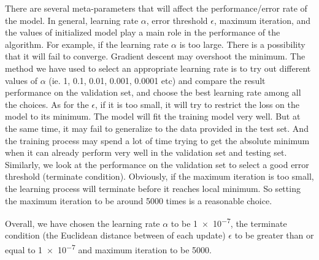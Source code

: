 \documentclass{article}
\begin{document}
\begin{part3}
There are several meta-parameters that will affect the performance/error rate of the model. In general, learning rate $\alpha$, error threshold $\epsilon$, maximum iteration, and the values of initialized model play a main role in the performance of the algorithm. For example, if the learning rate $\alpha$ is too large. There is a possibility that it will fail to converge. Gradient descent may overshoot the minimum. The method we have used to select an appropriate learning rate is to try out different values of $\alpha$ (ie. 1, 0.1, 0.01, 0.001, 0.0001 etc) and compare the result performance on the validation set, and choose the best learning rate among all the choices. As for the $\epsilon$, if it is too small, it will try to restrict the loss on the model to its minimum. The model will fit the training model very well. But at the same time, it may fail to generalize to the data provided in the test set. And the training process may spend a lot of time trying to get the absolute minimum when it can already perform very well in the validation set and testing set. Similarly, we look at the performance on the validation set to select a good error threshold (terminate condition). Obviously, if the maximum iteration is too small, the learning process will terminate before it reaches local minimum. So setting the maximum iteration to be around 5000 times is a reasonable choice.

\vspace{5mm}

Overall, we have chosen the learning rate $\alpha$ to be \num{1e-7}, the terminate condition (the Euclidean distance between of each update) $\epsilon$ to be greater than or equal to \num{1e-7} and maximum iteration to be 5000.



\end{part3}
\end{document}
